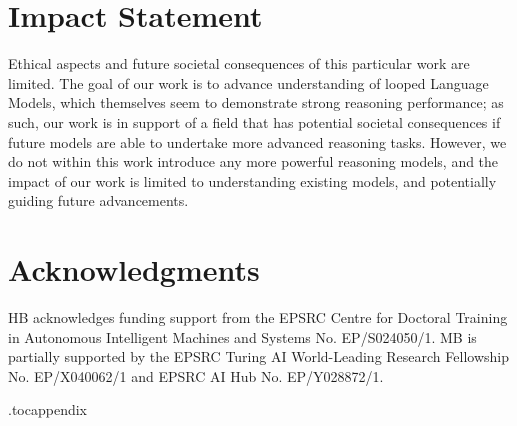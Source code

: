 \documentclass{article}
\theoremstyle{plain}
\theoremstyle{definition}
\theoremstyle{remark}
\begin{document}
\clearpage
\section*{Impact Statement}

Ethical aspects and future societal consequences of this particular work are limited. The goal of our work is to advance understanding of looped Language Models, which themselves seem to demonstrate strong reasoning performance; as such, our work is in support of a field that has potential societal consequences if future models are able to undertake more advanced reasoning tasks. However, we do not within this work introduce any more powerful reasoning models, and the impact of our work is limited to understanding existing models, and potentially guiding future advancements.

\section*{Acknowledgments}

HB acknowledges funding support from the EPSRC Centre for Doctoral Training in Autonomous Intelligent Machines and Systems No. EP/S024050/1. MB is partially supported by the EPSRC Turing AI World-Leading Research Fellowship No. EP/X040062/1 and EPSRC AI Hub No. EP/Y028872/1.






\newpage
\appendix
\onecolumn

\etocdepthtag.toc{appendix}
\setcounter{tocdepth}{3}
\tableofcontents                        %




\end{document}
